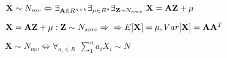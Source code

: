 \documentclass[preview, border=1pt, convert={outext=.png}]{standalone}
\begin{document}
$
\mathbf{X} \sim N_{mv} \Leftrightarrow
\exists_{\mathbf{A}\in R^{n\times k}}
\exists_{\mu \in R^{n}}
\exists_{\mathbf{Z} \sim N_{smv}} \
\mathbf{X} = \mathbf{A}\mathbf{Z} + \mu
\newline
$

$
\mathbf{X} = \mathbf{A}\mathbf{Z} + \mu :
\mathbf{Z} \sim N_{smv}\Rightarrow \newline
\Rightarrow
E[\mathbf{X}]=\mu, Var[\mathbf{X}]=\mathbf{A}\mathbf{A}^{T}
\newline
$

$
\mathbf{X} \sim N_{mv} \Leftrightarrow
\forall_{a_{i}\in R} \ \ \sum_{1}^{n}a_{i}X_{i} \sim N
$
\end{document}
